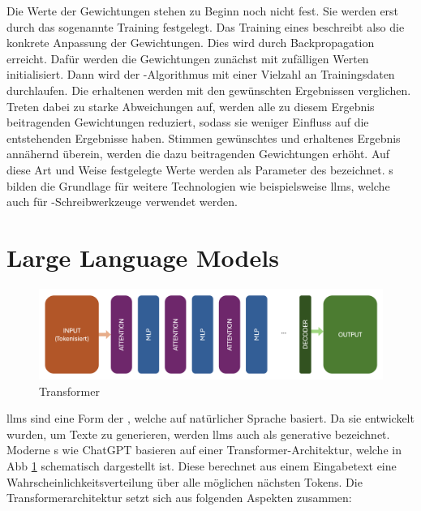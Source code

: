 \documentclass[../main.tex]{subfiles}
\begin{document}
Die Werte der Gewichtungen stehen zu Beginn noch nicht fest. Sie werden erst durch das sogenannte Training festgelegt. Das Training eines  beschreibt also die konkrete Anpassung der 
Gewichtungen. Dies wird durch Backpropagation erreicht. Dafür werden die Gewichtungen zunächst mit zufälligen Werten initialisiert. Dann wird der -Algorithmus mit einer Vielzahl an 
Trainingsdaten durchlaufen. Die erhaltenen werden mit den gewünschten Ergebnissen verglichen. Treten dabei zu starke Abweichungen auf, werden alle zu diesem Ergebnis beitragenden 
Gewichtungen reduziert, sodass sie weniger Einfluss auf die entstehenden Ergebnisse haben. Stimmen gewünschtes und erhaltenes Ergebnis annähernd überein, werden die dazu beitragenden 
Gewichtungen erhöht. Auf diese Art und Weise festgelegte Werte werden als Parameter des  bezeichnet.
s bilden die Grundlage für weitere Technologien wie beispielsweise \glspl{llm}, welche auch für -Schreibwerkzeuge verwendet werden. 

\section{Large Language Models}
\label{sec:llm}

\begin{figure}[h!]
  \includegraphics[scale=0.37]{bilder/Transformer.png}
  \caption{Transformer}
  \label{fig:trans}
\end{figure}
\glspl{llm} sind eine Form der , welche auf natürlicher Sprache basiert. Da sie entwickelt wurden, um Texte zu generieren, werden \glspl{llm} auch als generative  bezeichnet.
Moderne s wie ChatGPT basieren auf einer Transformer-Architektur, welche in Abb \ref{fig:trans} schematisch dargestellt ist. Diese berechnet aus einem Eingabetext eine Wahrscheinlichkeitsverteilung 
über alle möglichen nächsten Tokens. Die Transformerarchitektur setzt sich aus folgenden Aspekten zusammen:\cite{architecture}\\
\end{document}
